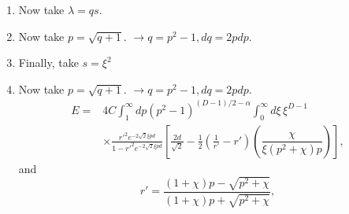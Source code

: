 \begin{enumerate}
\item Now take $\lambda = qs$.  
\item Now take $p = \sqrt{q+1}$.  $\rightarrow  q = p^2-1, dq = 2p dp$.  
\item Finally, take 
$s = \xi^2$
\item Now take $p = \sqrt{q+1}$.  $\rightarrow  q = p^2-1, dq = 2p dp$.  
 \begin{align}
E%
=&  4C\int_1^\infty dp (p^2-1)^{(D-1)/2-\alpha}\int_0^\infty d\xi\,\xi^{D-1}\nonumber\\
&\times  \frac{r'^2e^{-2\sqrt{2}\xi pd}}{1-r'^2e^{-2\sqrt{2}\xi pd}}\left[\frac{2d}{\sqrt{2}}-
 \frac{1}{2}\left(\frac{1}{r'}-r'\right)\left(\dfrac{\chi}{\xi(p^2+\chi)p}\right)\right],
\end{align}
and 
\begin{equation}
r' =  \frac{(1+\chi)p-\sqrt{p^2 + \chi}}{(1+ \chi)p+\sqrt{p^2+\chi}},
\end{equation}


\end{enumerate}
